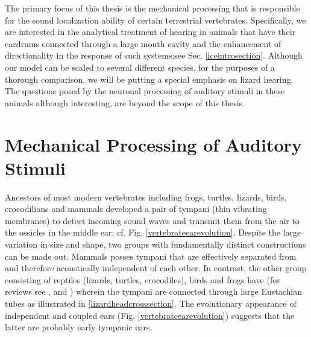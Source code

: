 The primary focus of this thesis is the mechanical processing that is responsible for the
sound localization ability of certain terrestrial vertebrates. Specifically, we are interested
in the analytical treatment of hearing in animals that have their eardrums connected through a large mouth cavity and the
 enhancement of directionality in the response of such systems;see Sec. \ref{iceintrosection}. Although our model can be scaled to several different species,
 for the purposes of a thorough comparison, we will be putting a special emphasis on lizard hearing. The questions posed by the neuronal processing of auditory stimuli in these
animals although interesting, are beyond the scope of this thesis.

\section{Mechanical Processing of Auditory Stimuli}\label{mechanicalprocessing}
Ancestors of most modern vertebrates including frogs, turtles, lizards, birds, crocodilians and mammals
developed a pair of tympani (thin vibrating membranes) to detect incoming sound waves and transmit
them from the air to the ossicles in the middle ear; cf. Fig. \ref{vertebrateearevolution}. 
Despite the large variation in size and shape, two groups with fundamentally distinct constructions can be
made out. Mammals posses tympani that are effectively separated from and therefore acoustically 
independent of each other. In contrast, the other group consisting of reptiles (lizards, turtles, crocodiles), birds and frogs
have  (for reviews see \cite{carrsoares}, \cite{dalsgaardcarr} and \cite{schnuppcarr}) wherein
the tympani are connected through large Eustachian tubes as illustrated in \ref{lizardheadcrosssection}. The evolutionary 
appearance of independent and coupled ears (Fig. \ref{vertebrateearevolution}) suggests that the latter are probably early
tympanic ears.
